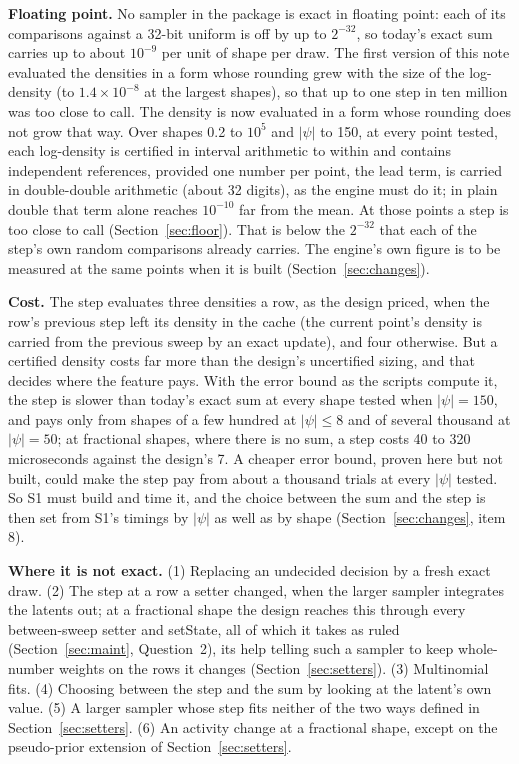 \documentclass[11pt]{article}
\theoremstyle{definition}
\begin{document}
\textbf{Floating point.} No sampler in the package is exact in floating point: each of its comparisons against a
32-bit uniform is off by up to $2^{-32}$, so today's exact sum carries up to about $10^{-9}$ per unit of shape per draw.
The first version of this note evaluated the densities in a form whose rounding grew with the size of the
log-density (to $1.4\times10^{-8}$ at the largest shapes), so that up to one step in ten million was too close to
call. The density is now evaluated in a form whose rounding does not grow that way. Over shapes 0.2 to $10^5$ and
$|\psi|$ to 150, at every point tested, each log-density is certified in interval arithmetic to within \FLOORDENS{}
and contains independent references, provided one number per point, the lead term, is carried in double-double
arithmetic (about 32 digits), as the engine must do it; in plain double that term alone reaches $10^{-10}$ far from
the mean. At those points a step is too close to call \FLOORSTEPWORDS{} (Section~\ref{sec:floor}). That is below the
$2^{-32}$ that each of the step's own random comparisons already carries. The engine's own figure is to be measured
at the same points when it is built (Section~\ref{sec:changes}).

\textbf{Cost.} The step evaluates three densities a row, as the design priced, when the row's previous step left
its density in the cache (the current point's density is carried from the previous sweep by an exact update), and
four otherwise. But a certified density costs far more than the design's uncertified sizing, and that decides
where the feature pays. With the error bound as the scripts compute it, the step is slower than today's exact sum
at every shape tested when $|\psi|=150$, and pays only from shapes of a few hundred at $|\psi|\le8$ and of several
thousand at $|\psi|=50$; at fractional shapes, where there is no sum, a step costs 40 to 320 microseconds against
the design's 7. A cheaper error bound, proven here but not built, could make the step pay from about a thousand
trials at every $|\psi|$ tested. So S1 must build and time it, and the choice between the sum and the step is then
set from S1's timings by $|\psi|$ as well as by shape (Section~\ref{sec:changes}, item 8).

\textbf{Where it is not exact.} (1) Replacing an undecided decision by a fresh exact draw. (2) The step at a row
a setter changed, when the larger sampler integrates the latents out; at a fractional shape the design reaches
this through every between-sweep setter and setState, all of which it takes as ruled (Section~\ref{sec:maint},
Question~2), its help telling such a sampler to keep whole-number weights on the rows it changes
(Section~\ref{sec:setters}). (3) Multinomial fits.
(4) Choosing between the step and the sum by looking at the latent's own value. (5) A larger sampler whose step
fits neither of the two ways defined in Section~\ref{sec:setters}. (6) An activity change at a fractional
shape, except on the pseudo-prior extension of Section~\ref{sec:setters}.
\end{document}
